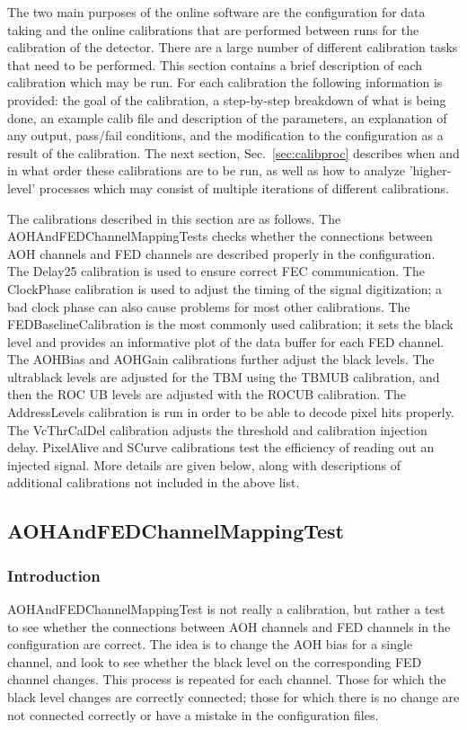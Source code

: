 
The two main purposes of the online software are the configuration for data taking and the online calibrations that are performed between runs for the calibration of the detector. There are a large number of different calibration tasks that need to be performed. This section contains a brief description of each calibration which may be run. For each calibration the following information is provided: the goal of the calibration, a step-by-step breakdown of what is being done, an example calib file and description of the parameters, an explanation of any output, pass/fail conditions, and the modification to the configuration as a result of the calibration. The next section, Sec.~\ref{sec:calibproc} describes when and in what order these calibrations are to be run, as well as how to analyze 'higher-level' processes which may consist of multiple iterations of different calibrations.

The calibrations described in this section are as follows. The AOHAndFEDChannelMappingTests checks whether the connections between AOH channels and FED channels are described properly in the configuration. The Delay25 calibration is used to ensure correct FEC communication. The ClockPhase calibration is used to adjust the timing of the signal digitization; a bad clock phase can also cause problems for most other calibrations.  The FEDBaselineCalibration is the most commonly used calibration; it sets the black level and provides an informative plot of the data buffer for each FED channel. The AOHBias and AOHGain calibrations further adjust the black levels. The ultrablack levels are adjusted for the TBM using the TBMUB calibration, and then the ROC UB levels are adjusted with the ROCUB calibration. The AddressLevels calibration is run in order to be able to decode pixel hits properly. The VcThrCalDel calibration adjusts the threshold and calibration injection delay. PixelAlive and SCurve calibrations test the efficiency of reading out an injected signal. More details are given below, along with descriptions of additional calibrations not included in the above list.

\subsection{AOHAndFEDChannelMappingTest}
\label{sec:AOHAndFEDChannelMappingTestCalibration}

\subsubsection{Introduction}
AOHAndFEDChannelMappingTest is not really a calibration, but rather a test to see whether the connections between AOH channels and FED channels in the configuration are correct.  The idea is to change the AOH bias for a single channel, and look to see whether the black level on the corresponding FED channel changes. This process is repeated for each channel. Those for which the black level changes are correctly connected; those for which there is no change are not connected correctly or have a mistake in the configuration files.

